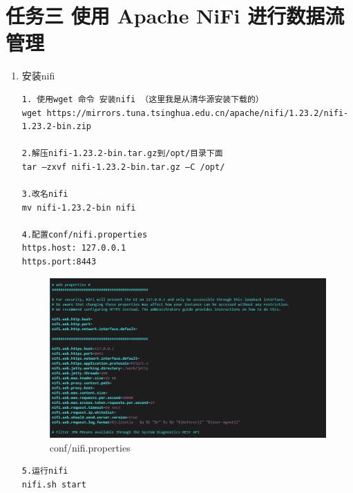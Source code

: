 \documentclass{article}
\begin{document}
\section{任务三 使用 Apache NiFi 进行数据流管理}
\begin{enumerate}
    \item 安装nifi
    \begin{lstlisting}
1. 使用wget 命令 安装nifi （这里我是从清华源安装下载的）
wget https://mirrors.tuna.tsinghua.edu.cn/apache/nifi/1.23.2/nifi-1.23.2-bin.zip

2.解压nifi-1.23.2-bin.tar.gz到/opt/目录下面
tar –zxvf nifi-1.23.2-bin.tar.gz –C /opt/

3.改名nifi
mv nifi-1.23.2-bin nifi

4.配置conf/nifi.properties
https.host: 127.0.0.1
https.port:8443
    \end{lstlisting}
    \begin{figure}[htp]
        \centering
        \includegraphics[width=15cm]{nifi_配置.png}
        \caption{conf/nifi.properties}
        \label{pic6}
    \end{figure}
    \begin{lstlisting}
5.运行nifi
nifi.sh start


\end{lstlisting}
\end{enumerate}
\end{document}

